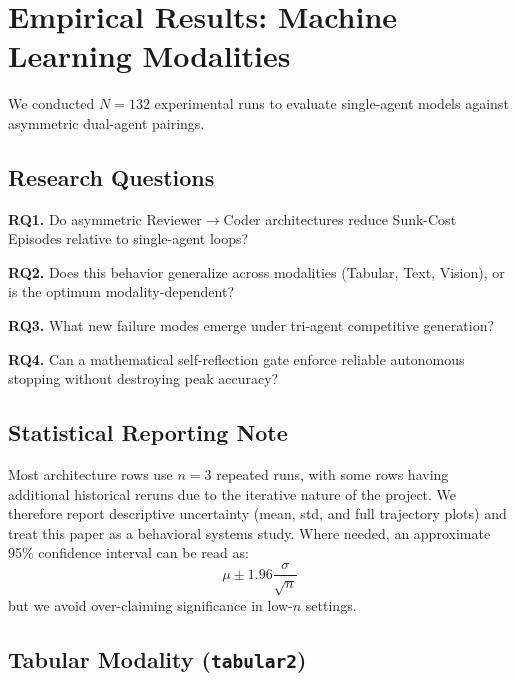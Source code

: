 \documentclass[11pt,a4paper]{article}
\begin{document}
\section{Empirical Results: Machine Learning Modalities}

We conducted $N=132$ experimental runs to evaluate single-agent models against asymmetric dual-agent pairings.

\subsection{Research Questions}

\textbf{RQ1.} Do asymmetric Reviewer$\rightarrow$Coder architectures reduce Sunk-Cost Episodes relative to single-agent loops?

\textbf{RQ2.} Does this behavior generalize across modalities (Tabular, Text, Vision), or is the optimum modality-dependent?

\textbf{RQ3.} What new failure modes emerge under tri-agent competitive generation?

\textbf{RQ4.} Can a mathematical self-reflection gate enforce reliable autonomous stopping without destroying peak accuracy?

\subsection{Statistical Reporting Note}

Most architecture rows use $n=3$ repeated runs, with some rows having additional historical reruns due to the iterative nature of the project. We therefore report descriptive uncertainty (mean, std, and full trajectory plots) and treat this paper as a behavioral systems study. Where needed, an approximate 95\% confidence interval can be read as:
\begin{equation}
    \mu \pm 1.96\frac{\sigma}{\sqrt{n}}
\end{equation}
but we avoid over-claiming significance in low-$n$ settings.

\subsection{Tabular Modality (\texttt{tabular2})}
\end{document}

